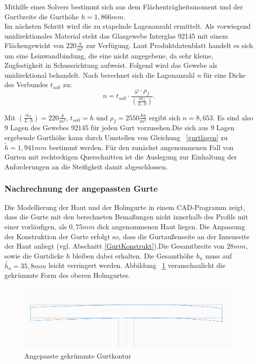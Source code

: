 \noindent Mithilfe eines Solvers bestimmt sich aus dem Flächenträgheitsmoment und der Gurtbreite die Gurthöhe $ h=1,866mm $.\\
\noindent Im nächsten Schritt wird die zu stapelnde Lagenanzahl ermittelt. Als vorwiegend unidirektionales Material steht das Glasgewebe Interglas 92145 mit einem Flächengewicht von $ 220\frac{g}{m^{2}} $ zur Verfügung. Laut Produktdatenblatt \cite{item17} handelt es sich um eine Leinwandbindung, die eine nicht angegebene, da sehr kleine, Zugfestigkeit in Schussrichtung aufweist. Folgend wird das Gewebe als unidirektional behandelt. Nach \cite{item3} berechnet sich die Lagenanzahl $ n $ für eine Dicke des Verbundes $ t_{soll} $ zu:\\

\begin{equation}
	\label{gurtlagen}
	n=t_{soll}\cdot \frac{\varphi\cdot\rho_{f}}{\left(\frac{m_{f}}{L\cdot b}\right)}.
\end{equation}

\noindent Mit $ \left(\frac{m_{f}}{L\cdot b}\right) = 220\frac{g}{m^{2}} $, $ t_{soll}=h $ und $ \rho_{f}=2550\frac{kg}{m^{3}} $ ergibt sich $ n=8,653 $. Es sind also 9 Lagen des Gewebes 92145 für jeden Gurt vorzusehen.Die sich aus 9 Lagen ergebende Gurthöhe kann durch Umstellen von Gleichung ~\ref{gurtlagen} zu $ \tilde{h}=1,941mm $ bestimmt werden. Für den zunächst angenommenen Fall von Gurten mit rechteckigen Querschnitten ist die Auslegung zur Einhaltung der Anforderungen an die Steifigkeit damit abgeschlossen.\\


\subsubsection{Nachrechnung der angepassten Gurte} \label{NachrechnungGurte}
 Die Modellierung der Haut und der Holmgurte in einem CAD-Programm zeigt, dass die Gurte mit den berechneten Bemaßungen nicht innerhalb des Profils mit einer vorläufigen, als $ 0,75mm $ dick angenommenen Haut liegen. Die Anpassung der Konstruktion der Gurte erfolgt so, dass die Gurtaußenseite an der Innenseite der Haut anliegt (vgl. Abschnitt \ref{GurtKonstrukt}).Die Gesamtbreite von $ 28mm $, sowie die Gurtdicke $ h $ bleiben dabei erhalten. Die Gesamthöhe $ h_{a} $ muss auf $ \tilde{h_{a}}=35,8mm $ leicht verringert werden. Abbildung ~\ref{fig: KrummerGurt} veranschaulicht die gekrümmte Form des oberen Holmgurtes.
 \begin{figure}[h]
 	\includegraphics[width=1.0\textwidth]{Bilder/KrummerGurt.jpg}
 	\caption{Angepasste gekrümmte Gurtkontur}
 	\label{fig: KrummerGurt}
 \end{figure}


